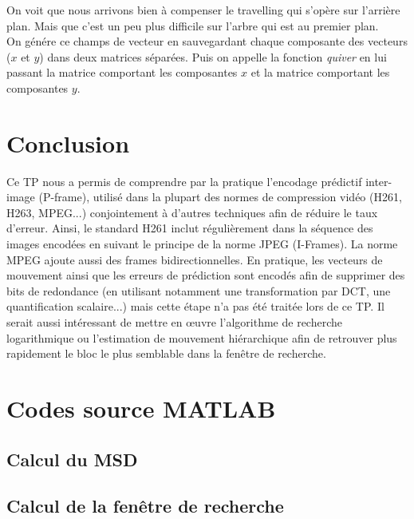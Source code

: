 \documentclass[a4paper, 12pt]{article}
\newcommand{\FSource}[1]{%

}
\begin{document}
On voit que nous arrivons bien à compenser le travelling qui s'opère sur l'arrière plan. Mais que c'est un peu plus difficile sur l'arbre qui est au premier plan.\\

On génére ce champs de vecteur en sauvegardant chaque composante des vecteurs ($x$ et $y$) dans deux matrices séparées. Puis on appelle la fonction \textit{quiver} en lui passant la matrice comportant les composantes $x$ et la matrice comportant les composantes $y$.



\newpage

\section{Conclusion}

Ce TP nous a permis de comprendre par la pratique l'encodage prédictif inter-image (P-frame), utilisé dans la plupart des normes de compression vidéo (H261, H263, MPEG...) conjointement à d'autres techniques afin de réduire le taux d'erreur. Ainsi, le standard H261 inclut régulièrement dans la séquence des images encodées en suivant le principe de la norme JPEG (I-Frames). La norme MPEG ajoute aussi des frames bidirectionnelles. 
En pratique, les vecteurs de mouvement ainsi que les erreurs de prédiction sont encodés afin de supprimer des bits de redondance (en utilisant notamment une transformation par DCT, une quantification scalaire...) mais cette étape n'a pas été traitée lors de ce TP.
Il serait aussi intéressant de mettre en œuvre l'algorithme de recherche logarithmique ou l'estimation de mouvement hiérarchique afin de retrouver plus rapidement le bloc le plus semblable dans la fenêtre de recherche.

\clearpage

%
%
\appendix

\section{Codes source MATLAB}

\subsection{Calcul du MSD}\label{msd_code}

\FSource{../compute_msd.m}

\newpage

\subsection{Calcul de la fenêtre de recherche}\label{search_window}
\end{document}
